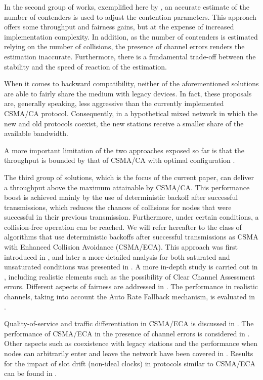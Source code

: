 \documentclass[conference]{IEEEtran}
\begin{document}
In the second group of works, exemplified here by \cite{cali2000dti,lopez-toledo2006aoi}, an accurate estimate of the number of contenders is used to adjust the contention parameters. This approach offers some throughput and fairness gains, but at the expense of increased implementation complexity. In addition, as the number of contenders is estimated relying on the number of collisions, the presence of channel errors renders the estimation inaccurate.
Furthermore, there is a fundamental trade-off between the stability and the speed of reaction of the estimation.

When it comes to backward compatibility, neither of the aforementioned solutions are able to fairly share the medium with legacy devices.
In fact, these proposals are, generally speaking, less aggressive than the currently implemented CSMA/CA protocol. Consequently, in a hypothetical mixed network in which the new and old protocols coexist, the new stations receive a smaller share of the available bandwidth.

A more important limitation of the two approaches exposed so far is that the throughput is bounded by that of CSMA/CA with optimal configuration \cite{cali2000dti,bianchi2000pai}.

The third group of solutions, which is the focus of the current paper, can deliver a throughput above the maximum attainable by CSMA/CA. This performance boost is achieved mainly by the use of deterministic backoff after successful transmissions, which reduces the chances of collisions for nodes that were successful in their previous transmission. Furthermore, under certain conditions, a collision-free operation can be reached. {We will refer hereafter to the class of algorithms that use deterministic backoffs after successful transmissions as CSMA with Enhanced Collision Avoidance (CSMA/ECA).} This approach was first introduced in \cite{barcelo2008lba}, and later a more detailed analysis for both saturated and unsaturated conditions was presented in \cite{bellalta2009vtc}.
A more in-depth study is carried out in \cite{he2009srb}, including realistic elements such as the possibility of Clear Channel Assessment errors.
Different aspects of fairness are addressed in \cite{he2009srb,barcelo2010fcc,fang2011dlm}.
The performance in realistic channels, taking into account the Auto Rate Fallback mechanism, is evaluated in \cite{martorell2012pec,martorell2012tfl}.

Quality-of-service and traffic differentiation in CSMA/ECA is discussed in \cite{barcelo2009tpc, he2009srb}.
The performance of CSMA/ECA in the presence of channel errors is considered in \cite{he2009srb, barcelo2010fcc, fang2011dlm, barcelo2012mdc}.
Other aspects such as coexistence with legacy stations and the performance when nodes can arbitrarily enter and leave the network have been covered in \cite{he2009srb, barcelo2010fcc, fang2011dlm}.
Results for the impact of slot drift (non-ideal clocks) in protocols similar to CSMA/ECA can be found in \cite{gong2012asd}.
\end{document}
